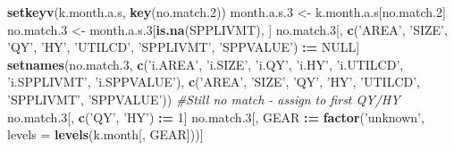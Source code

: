 \documentclass[]{article}
\newenvironment{Shaded}{\begin{snugshade}}{\end{snugshade}}
\newcommand{\KeywordTok}[1]{\textcolor[rgb]{0.13,0.29,0.53}{\textbf{#1}}}
\newcommand{\DataTypeTok}[1]{\textcolor[rgb]{0.13,0.29,0.53}{#1}}
\newcommand{\DecValTok}[1]{\textcolor[rgb]{0.00,0.00,0.81}{#1}}
\newcommand{\StringTok}[1]{\textcolor[rgb]{0.31,0.60,0.02}{#1}}
\newcommand{\CommentTok}[1]{\textcolor[rgb]{0.56,0.35,0.01}{\textit{#1}}}
\newcommand{\OtherTok}[1]{\textcolor[rgb]{0.56,0.35,0.01}{#1}}
\newcommand{\OperatorTok}[1]{\textcolor[rgb]{0.81,0.36,0.00}{\textbf{#1}}}
\newcommand{\ErrorTok}[1]{\textcolor[rgb]{0.64,0.00,0.00}{\textbf{#1}}}
\newcommand{\NormalTok}[1]{#1}
\begin{document}
\begin{Shaded}
\begin{Highlighting}[]
  \KeywordTok{setkeyv}\NormalTok{(k.month.a.s, }\KeywordTok{key}\NormalTok{(no.match.}\DecValTok{2}\NormalTok{))}
\NormalTok{  month.a.s.}\DecValTok{3}\NormalTok{ <-}\StringTok{ }\NormalTok{k.month.a.s[no.match.}\DecValTok{2}\NormalTok{]}
\NormalTok{  no.match.}\DecValTok{3}\NormalTok{ <-}\StringTok{ }\NormalTok{month.a.s.}\DecValTok{3}\NormalTok{[}\KeywordTok{is.na}\NormalTok{(SPPLIVMT), ]}
\NormalTok{  no.match.}\DecValTok{3}\NormalTok{[, }\KeywordTok{c}\NormalTok{(}\StringTok{'AREA'}\NormalTok{, }\StringTok{'SIZE'}\NormalTok{, }\StringTok{'QY'}\NormalTok{, }\StringTok{'HY'}\NormalTok{, }\StringTok{'UTILCD'}\NormalTok{, }\StringTok{'SPPLIVMT'}\NormalTok{, }\StringTok{'SPPVALUE'}\NormalTok{) }\OperatorTok{:}\ErrorTok{=}\StringTok{ }\OtherTok{NULL}\NormalTok{]}
  \KeywordTok{setnames}\NormalTok{(no.match.}\DecValTok{3}\NormalTok{, }\KeywordTok{c}\NormalTok{(}\StringTok{'i.AREA'}\NormalTok{, }\StringTok{'i.SIZE'}\NormalTok{, }\StringTok{'i.QY'}\NormalTok{, }\StringTok{'i.HY'}\NormalTok{, }\StringTok{'i.UTILCD'}\NormalTok{, }\StringTok{'i.SPPLIVMT'}\NormalTok{, }\StringTok{'i.SPPVALUE'}\NormalTok{), }
                       \KeywordTok{c}\NormalTok{(}\StringTok{'AREA'}\NormalTok{, }\StringTok{'SIZE'}\NormalTok{, }\StringTok{'QY'}\NormalTok{, }\StringTok{'HY'}\NormalTok{, }\StringTok{'UTILCD'}\NormalTok{, }\StringTok{'SPPLIVMT'}\NormalTok{, }\StringTok{'SPPVALUE'}\NormalTok{))}
  \CommentTok{#Still no match - assign to first QY/HY}
\NormalTok{  no.match.}\DecValTok{3}\NormalTok{[, }\KeywordTok{c}\NormalTok{(}\StringTok{'QY'}\NormalTok{, }\StringTok{'HY'}\NormalTok{) }\OperatorTok{:}\ErrorTok{=}\StringTok{ }\DecValTok{1}\NormalTok{]}
\NormalTok{  no.match.}\DecValTok{3}\NormalTok{[, GEAR }\OperatorTok{:}\ErrorTok{=}\StringTok{ }\KeywordTok{factor}\NormalTok{(}\StringTok{'unknown'}\NormalTok{, }\DataTypeTok{levels =} \KeywordTok{levels}\NormalTok{(k.month[, GEAR]))]}
  

\end{Highlighting}
\end{Shaded}
\end{document}
